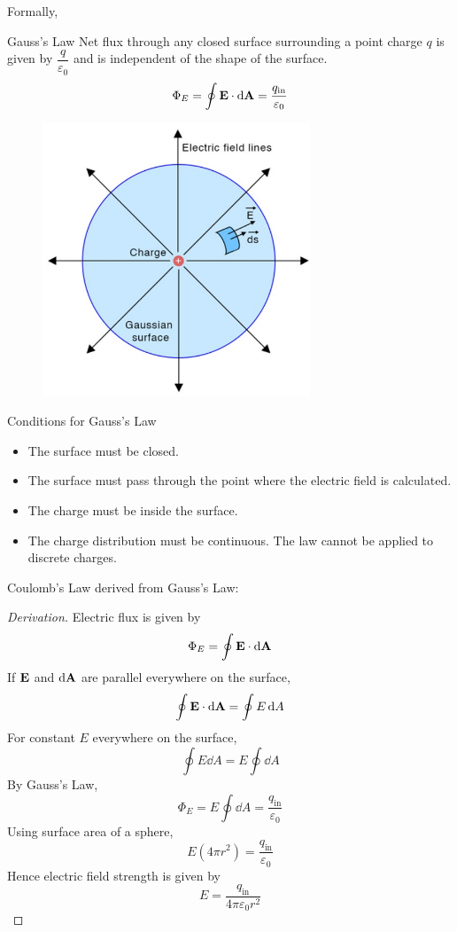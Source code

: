 Formally, 
\begin{thrm}{Gauss's Law}{}
Net flux through any closed surface surrounding a point charge $q$ is given by $\dfrac{q}{\varepsilon_0}$ and is independent of the shape of the surface.
\begin{equation}
{\Phi_E = \oint\vb{E}\cdot\dd{\vb{A}} = \frac{q_\text{in}}{\varepsilon_0}
}\end{equation}
\end{thrm}

\begin{figure}[H]
    \centering
    \includegraphics[width=8cm]{images/gauss_law_e.jpg}
\end{figure}

Conditions for Gauss's Law
\begin{itemize}
\item The surface must be closed.
\item The surface must pass through the point where the electric field is calculated.
\item The charge must be inside the surface.
\item The charge distribution must be continuous. The law cannot be applied to discrete charges.
\end{itemize}

Coulomb's Law derived from Gauss's Law:
\begin{proof}[Derivation]
Electric flux is given by
\[ \Phi_E = \oint\vb{E}\cdot\dd{\vb{A}} \]
If $\vb{E}$ and $\dd{\vb{A}}$ are parallel everywhere on the surface,
\[ \oint\vb{E}\cdot\dd{\vb{A}} = \oint E \dd{A} \]
For constant $E$ everywhere on the surface,
\[ \oint E \dd{A} = E \oint \dd{A}  \]
By Gauss's Law, 
\[ \Phi_E = E \oint \dd{A} = \frac{q_\text{in}}{\varepsilon_0} \]
Using surface area of a sphere,
\[ E(4\pi r^2) = \frac{q_\text{in}}{\varepsilon_0} \]
Hence electric field strength is given by
\[ E = \frac{q_\text{in}}{4\pi\varepsilon_0 r^2} \]
\end{proof}


